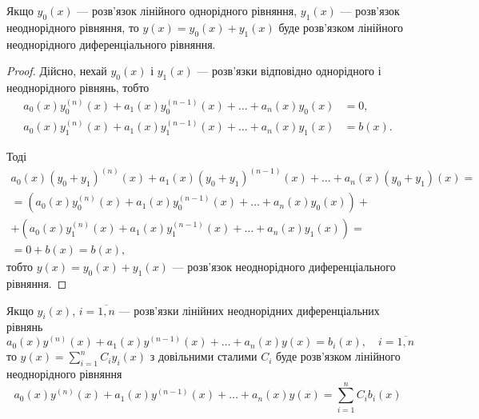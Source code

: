 \begin{property}
	Якщо $y_0(x)$ --- розв'язок лінійного однорідного рівняння, $y_1(x)$ --- розв'язок неоднорідного рівняння, то $y(x) = y_0(x) + y_1(x)$ буде розв'язком лінійного неоднорідного диференціального рівняння.
\end{property}

\begin{proof}
	Дійсно, нехай $y_0(x)$ і $y_1(x)$ --- розв'язки відповідно однорідного і неоднорідного рівнянь, тобто
	\begin{align*}
		a_0(x) y_0^{(n)}(x) + a_1(x) y_0^{(n - 1)}(x) + \ldots + a_n(x) y_0(x) &= 0, \\
		a_0(x) y_1^{(n)}(x) + a_1(x) y_1^{(n - 1)}(x) + \ldots + a_n(x) y_1(x) &= b(x).
	\end{align*}	
	
	Тоді 
	\begin{multline*}
		a_0(x) (y_0 + y_1)^{(n)}(x) + a_1(x) (y_0 + y_1)^{(n - 1)}(x) + \ldots + a_n(x) (y_0 + y_1)(x) = \\ = \left( a_0(x) y_0^{(n)}(x) + a_1(x) y_0^{(n - 1)}(x) + \ldots + a_n(x) y_0(x) \right) + \\ + \left( a_0(x) y_1^{(n)}(x) + a_1(x) y_1^{(n - 1)}(x) + \ldots + a_n(x) y_1(x) \right) = \\ = 0 + b(x) = b(x),
	\end{multline*}
	тобто $y(x) = y_0(x) + y_1(x)$ --- розв'язок неоднорідного диференціального рівняння.
\end{proof}

\begin{property}
	Якщо $y_i(x)$, $i = \overline{1, n}$ --- розв'язки лінійних неоднорідних диференціальних рівнянь
	\begin{equation*}
		a_0(x) y^{(n)}(x) + a_1(x) y^{(n - 1)}(x) + \ldots + a_n(x) y(x) = b_i(x), \quad i = \overline{1, n}
	\end{equation*}
	то $y(x) = \sum_{i = 1}^n C_i y_i(x)$ з довільними сталими $C_i$ буде розв'язком лінійного неоднорідного рівняння
	\begin{equation*}
		a_0(x) y^{(n)}(x) + a_1(x) y^{(n - 1)}(x) + \ldots + a_n(x) y(x) = \sum_{i = 1}^n C_i  b_i(x)
	\end{equation*}
\end{property}


